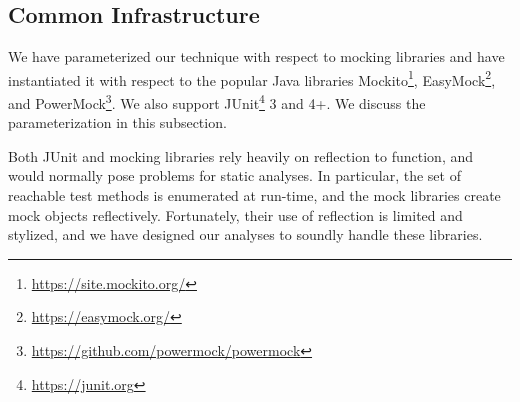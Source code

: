 



\subsection{Common Infrastructure}
\label{sec:common}
We have parameterized our technique with respect to mocking libraries and have instantiated it with respect to the popular Java libraries Mockito\footnote{\url{https://site.mockito.org/}}, EasyMock\footnote{\url{https://easymock.org/}}, and PowerMock\footnote{\url{https://github.com/powermock/powermock}}. We also support JUnit\footnote{\url{https://junit.org}} 3 and 4+. We discuss the parameterization in this subsection.

Both JUnit and mocking libraries rely heavily on reflection to function, and would normally pose problems for static analyses. In particular, the set of reachable test methods is enumerated at run-time, and the mock libraries create mock objects reflectively. Fortunately, their use of reflection is limited and stylized, and we have designed our analyses to soundly handle these libraries.

